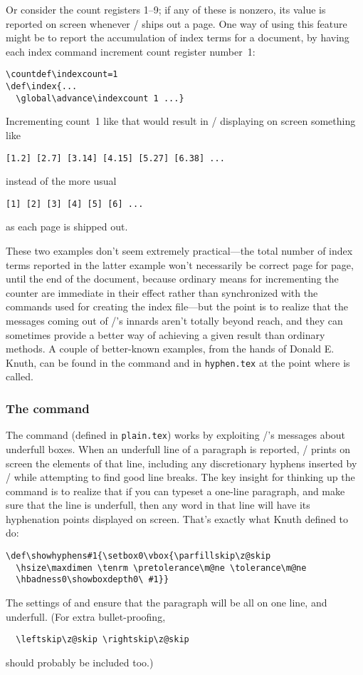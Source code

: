 {Or consider the count registers 1--9; if any of
these is nonzero, its value is reported on screen whenever \tex/
ships out a page. One way of using this feature might be to report
the accumulation of index terms for a document, by having each index command
increment count register number~1:
\begin{verbatim}
\countdef\indexcount=1
\def\index{...
  \global\advance\indexcount 1 ...}
\end{verbatim}
Incrementing count~1 like that would result in \tex/ displaying on
screen something like
\begin{verbatim}
[1.2] [2.7] [3.14] [4.15] [5.27] [6.38] ...
\end{verbatim}
instead of the more usual
\begin{verbatim}
[1] [2] [3] [4] [5] [6] ...
\end{verbatim}
as each page is shipped out.

These two examples don't seem extremely practical---the total number of
index terms reported in the latter example won't necessarily be correct
page for page, until the end of the document, because ordinary means
for incrementing the counter are immediate in their effect rather than
synchronized with the  commands used for creating the index
file---but the point is to realize that the messages coming out of
\tex/'s innards aren't totally beyond reach, and they can sometimes
provide a better way of achieving a given result than ordinary methods.
A couple of better-known examples, from the hands of Donald E. Knuth, can
be found in the  command and in {\tt hyphen.tex} at the
point where  is called.

\subsubsection{The  command}
The  command (defined in {\tt plain.tex})
works by exploiting \tex/'s messages about underfull boxes.
When an underfull line
of a paragraph is reported, \tex/ prints on screen the elements of that
line, including any discretionary hyphens inserted by  \tex/
while attempting to find good line breaks.
The key insight for thinking up the 
command is to realize that if you can typeset a one-line
paragraph, and make sure that the line is underfull, then
any word in that line will have its hyphenation points
displayed on screen. That's exactly what Knuth
defined  to do:
\begin{verbatim}
\def\showhyphens#1{\setbox0\vbox{\parfillskip\z@skip
  \hsize\maxdimen \tenrm \pretolerance\m@ne \tolerance\m@ne
  \hbadness0\showboxdepth0\ #1}}
\end{verbatim}
The settings of  and  ensure that the paragraph will
be all on one line, and underfull. (For extra bullet-proofing,
\begin{verbatim}
  \leftskip\z@skip \rightskip\z@skip
\end{verbatim}
should probably be included too.)

}
